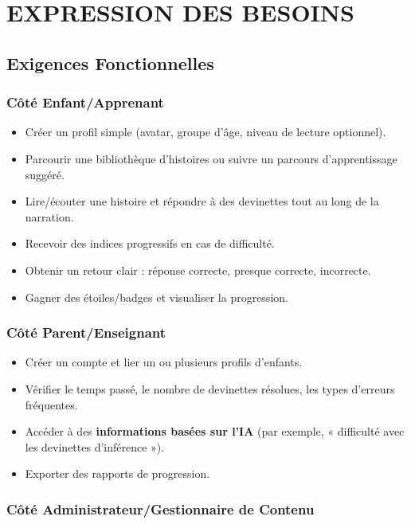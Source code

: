\documentclass[12pt,a4paper]{article}
\begin{document}
\newpage

\section{EXPRESSION DES BESOINS}

\subsection{Exigences Fonctionnelles}

\subsubsection{Côté Enfant/Apprenant}

\begin{itemize}
    \item Créer un profil simple (avatar, groupe d'âge, niveau de lecture optionnel).
    \item Parcourir une bibliothèque d'histoires ou suivre un parcours d'apprentissage suggéré.
    \item Lire/écouter une histoire et répondre à des devinettes tout au long de la narration.
    \item Recevoir des indices progressifs en cas de difficulté.
    \item Obtenir un retour clair : réponse correcte, presque correcte, incorrecte.
    \item Gagner des étoiles/badges et visualiser la progression.
\end{itemize}

\subsubsection{Côté Parent/Enseignant}

\begin{itemize}
    \item Créer un compte et lier un ou plusieurs profils d'enfants.
    \item Vérifier le temps passé, le nombre de devinettes résolues, les types d'erreurs fréquentes.
    \item Accéder à des \textbf{informations basées sur l'IA} (par exemple, « difficulté avec les devinettes d'inférence »).
    \item Exporter des rapports de progression.
\end{itemize}

\subsubsection{Côté Administrateur/Gestionnaire de Contenu}
\end{document}
